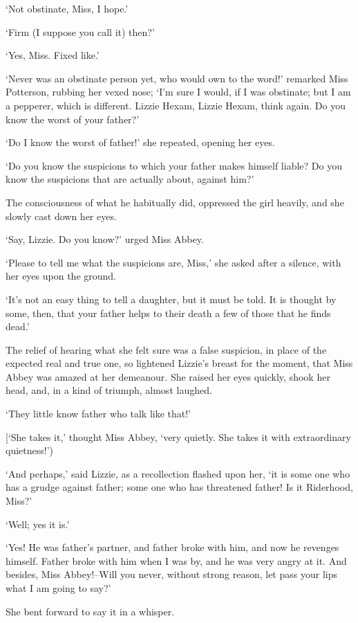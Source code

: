 ‘Not obstinate, Miss, I hope.’

‘Firm (I suppose you call it) then?’

‘Yes, Miss. Fixed like.’

‘Never was an obstinate person yet, who would own to the word!’ remarked
Miss Potterson, rubbing her vexed nose; ‘I’m sure I would, if I was
obstinate; but I am a pepperer, which is different. Lizzie Hexam, Lizzie
Hexam, think again. Do you know the worst of your father?’

‘Do I know the worst of father!’ she repeated, opening her eyes.

‘Do you know the suspicions to which your father makes himself liable?
Do you know the suspicions that are actually about, against him?’

The consciousness of what he habitually did, oppressed the girl heavily,
and she slowly cast down her eyes.

‘Say, Lizzie. Do you know?’ urged Miss Abbey.

‘Please to tell me what the suspicions are, Miss,’ she asked after a
silence, with her eyes upon the ground.

‘It’s not an easy thing to tell a daughter, but it must be told. It is
thought by some, then, that your father helps to their death a few of
those that he finds dead.’

The relief of hearing what she felt sure was a false suspicion, in place
of the expected real and true one, so lightened Lizzie’s breast for the
moment, that Miss Abbey was amazed at her demeanour. She raised her eyes
quickly, shook her head, and, in a kind of triumph, almost laughed.

‘They little know father who talk like that!’

[‘She takes it,’ thought Miss Abbey, ‘very quietly. She takes it with
extraordinary quietness!’)

‘And perhaps,’ said Lizzie, as a recollection flashed upon her, ‘it is
some one who has a grudge against father; some one who has threatened
father! Is it Riderhood, Miss?’

‘Well; yes it is.’

‘Yes! He was father’s partner, and father broke with him, and now he
revenges himself. Father broke with him when I was by, and he was very
angry at it. And besides, Miss Abbey!--Will you never, without strong
reason, let pass your lips what I am going to say?’

She bent forward to say it in a whisper.

